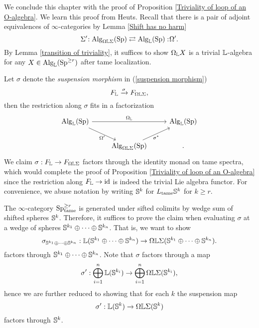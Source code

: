 We conclude this chapter with the proof of Proposition \ref{Triviality of loop of an O-algebra}.
We learn this proof from Heuts. 
Recall that there is a pair of adjoint equivalences of $\infty$-categories by Lemma \ref{Shift has no harm} 
$$
\Sigma'\negmedspace: \operatorname{Alg}_{\Omega {\mathbb{L}} \Sigma}(\operatorname{Sp}) \rightleftarrows \operatorname{Alg}_{{\mathbb{L}}}(\operatorname{Sp}):\negmedspace \Omega'.
$$
By Lemma \ref{transition of triviality},
it suffices to show $\Omega_{{\mathbb{L}}} X$ is a trivial ${\mathbb{L}}$-algebra for any $X\in \operatorname{Alg}_{{\mathbb{L}}}(\operatorname{Sp}^{\geq r})$ after tame localization.

Let $\sigma$ denote the \emph{suspension morphism} in (\ref{suspension morphism})
\[
F_{{\mathbb{L}}} \xrightarrow{\sigma} F_{\Omega {\mathbb{L}} \Sigma},
\]
then the restriction along $\sigma$ fits in a factorization
\[
\begin{tikzcd}
	\Alg_{\BL}(\Sp) &   & \Alg_{\BL}(\Sp) \\
	&  \Alg_{\Omega \BL \Sigma}(\Sp) &
	\arrow[from=1-1, to = 1-3, "\Omega_{\BL}"]
	\arrow[from=1-1 , to =2-2, "\Omega'" below]
	\arrow[from=2-2, to=1-3, "\sigma^*" below].
\end{tikzcd}
\]
We claim $\sigma:F_{{\mathbb{L}}}\to F_{\Omega {\mathbb{L}} \Sigma}$ factors through the identity monad on tame spectra, which would complete the proof of Proposition \ref{Triviality of loop of an O-algebra}
since the restriction along $F_{\mathbb{L}} \to \operatorname{id}$ is indeed the trivial Lie algebra functor. 
For convenience, we abuse notation by writing ${\mathbb{S}}^k$ for $L_{\operatorname{\operatorname{tame}}}{\mathbb{S}}^k$ for $k\geq r$.

The $\infty$-category $\operatorname{Sp}^{\geq r}_{\operatorname{\operatorname{tame}}}$ is generated under sifted colimits by wedge sum of shifted spheres ${\mathbb{S}}^k$.
Therefore, it suffices to prove the claim when evaluating $\sigma$ at a wedge of spheres
${\mathbb{S}}^{k_1}\oplus \cdots \oplus {\mathbb{S}}^{k_n}$.
That is, we want to show 
$$
\sigma_{{\mathbb{S}}^{k_1}\oplus \cdots \oplus {\mathbb{S}}^{k_n}}: 
{\mathbb{L}}({\mathbb{S}}^{k_1}\oplus \cdots \oplus {\mathbb{S}}^{k_n})
\to 
\Omega {\mathbb{L}} \Sigma ({\mathbb{S}}^{k_1}\oplus \cdots \oplus {\mathbb{S}}^{k_n}).
$$
factors through ${\mathbb{S}}^{k_1}\oplus \cdots \oplus {\mathbb{S}}^{k_n}$.
Note that $\sigma$ factors through a map
$$
\sigma':\bigoplus_{i=1}^{n} {\mathbb{L}}({\mathbb{S}}^{k_i}) \to 
\bigoplus_{i=1}^{n} \Omega{\mathbb{L}}\Sigma({\mathbb{S}}^{k_i}),
$$
hence we are further reduced to showing that for each $k$ the suspension map 
$$
\sigma':{\mathbb{L}}({\mathbb{S}}^{k}) \to 
\Omega{\mathbb{L}}\Sigma({\mathbb{S}}^{k})
$$
factors through ${\mathbb{S}}^{k}$.




